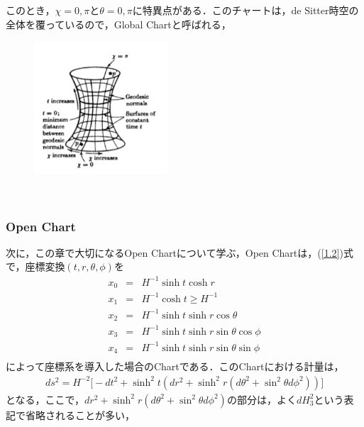 このとき，$\chi=0,\pi$と$\theta=0,\pi$に特異点がある．このチャートは，de Sitter時空の全体を覆っているので，Global Chartと呼ばれる，
\begin{figure}[H]
\begin{center}
  \includegraphics[width=5cm,angle=0]{deSitter.pdf}
  　　　\caption{}
  　　\label{desitter}
\end{center}
\end{figure}
\subsubsection{Open Chart}
次に，この章で大切になるOpen Chartについて学ぶ，Open Chartは，(\ref{1.2})式で，座標変換$(t,r,\theta,\phi)$を
\begin{eqnarray}
  x_0&=&H^{-1}\sinh{t}\cosh{r} \\
  x_1&=&H^{-1}\cosh{t} \geqslant H^{-1} \\
  x_2&=&H^{-1}\sinh{t}\sinh{r}\cos{\theta} \\
  x_3&=&H^{-1}\sinh{t}\sinh{r}\sin{\theta}\cos{\phi} \\
  x_4&=&H^{-1}\sinh{t}\sinh{r}\sin{\theta}\sin{\phi} \\
\end{eqnarray}
によって座標系を導入した場合のChartである．このChartにおける計量は，
\begin{eqnarray}
\label{openM}
      ds^2=H^{-2}\biggr[-dt^2+\sinh^2{t}(dr^2+\sinh^2r(d\theta^2+\sin^2\theta d\phi^2))\biggr]
\end{eqnarray}
となる，ここで，$dr^2+\sinh^2r(d\theta^2+\sin^2\theta d\phi^2)$の部分は，よく$dH_3^2$という表記で省略されることが多い，

